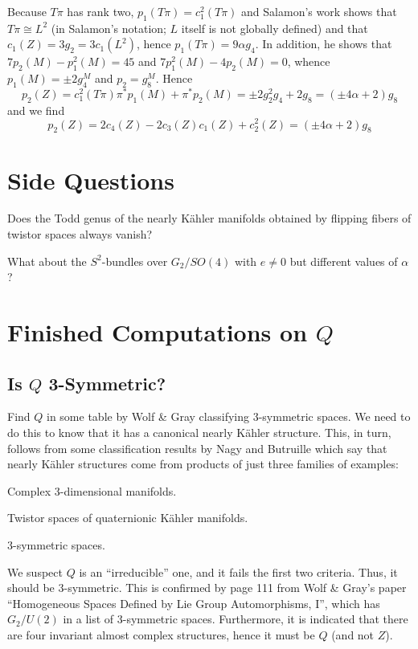 \documentclass{scrartcl}
\begin{document}
\medskip

Because $T\pi$ has rank two, $p_1(T\pi)=c_1^2(T\pi)$ and Salamon's work shows that $T\pi\cong L^2$ (in Salamon's notation; $L$ itself is not globally defined) and that $c_1(Z)=3g_2=3c_1(L^2)$, hence $p_1(T\pi)=9\alpha g_4$. In addition, he shows that $7p_2(M)-p_1^2(M)=45$ and $7p_1^2(M)-4p_2(M)=0$, whence $p_1(M)=\pm 2 g_4^M$ and $p_2=g_8^M$. Hence 
\begin{equation*}
	p_2(Z)=c_1^2(T\pi)\pi^* p_1(M)+\pi^*p_2(M)
	=\pm 2g_2^2g_4+2g_8=(\pm 4\alpha +2)g_8
\end{equation*}
and we find
\begin{equation*}
	p_2(Z)=2c_4(Z)-2c_3(Z)c_1(Z)+c_2^2(Z)=(\pm 4\alpha+2)g_8
\end{equation*}

\medskip


\section{Side Questions}

\begin{numberedlist}
	\item Does the Todd genus of the nearly K\"{a}hler manifolds obtained by flipping fibers of twistor spaces always vanish?
	\item What about the $S^2$-bundles over $G_2/SO(4)$ with $e\neq 0$ but different values of $\alpha$?
\end{numberedlist}

\section{Finished Computations on $Q$}

\subsection{Is $Q$ 3-Symmetric?}

Find $Q$ in some table by Wolf \& Gray classifying 3-symmetric spaces. We need to do this to know that it has a canonical nearly K\"{a}hler structure. This, in turn, follows from some classification results by Nagy and Butruille which say that nearly K\"{a}hler structures come from products of just three families of examples:
\begin{numberedlist}
	\item Complex 3-dimensional manifolds.
	\item Twistor spaces of quaternionic K\"{a}hler manifolds.
	\item 3-symmetric spaces.
\end{numberedlist}
We suspect $Q$ is an ``irreducible'' one, and it fails the first two criteria. Thus, it should be 3-symmetric. This is confirmed by page 111 from Wolf \& Gray's paper ``Homogeneous Spaces Defined by Lie Group Automorphisms, I'', which has $G_2/U(2)$ in a list of 3-symmetric spaces. Furthermore, it is indicated that there are four invariant almost complex structures, hence it must be $Q$ (and not $Z$).
\end{document}
